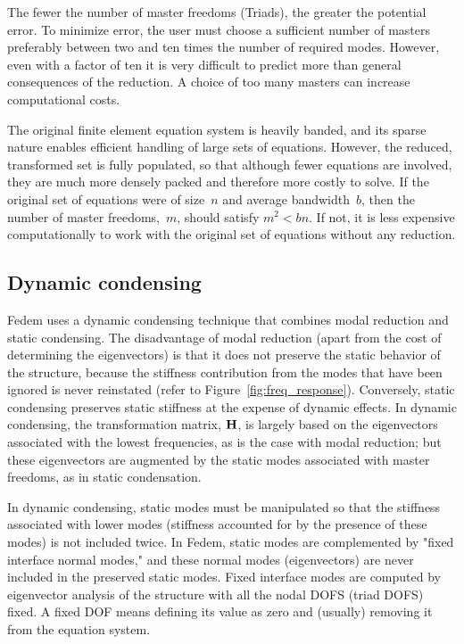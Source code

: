 The fewer the number of master freedoms (Triads), the greater the potential error. To minimize
error, the user must choose a sufficient number of masters \mdash{}preferably between two and
ten times the number of required modes. However, even with a factor of ten it is very difficult
to predict more than general consequences of the reduction. A choice of too many masters can
increase computational costs.

The original finite element equation system is heavily banded, and its sparse nature enables
efficient handling of large sets of equations. However, the reduced, transformed set is fully
populated, so that although fewer equations are involved, they are much more densely packed
and therefore more costly to solve. If the original set of equations were of size~$n$ and average
bandwidth~$b$, then the number of master freedoms,~$m$, should satisfy $m^{2} < bn$. If not,
it is less expensive computationally to work with the original set of equations without any
reduction.

\subsection{Dynamic condensing}

Fedem uses a dynamic condensing technique that combines modal reduction and static condensing.
The disadvantage of modal reduction (apart from the cost of determining the eigenvectors) is
that it does not preserve the static behavior of the structure, because the stiffness contribution
from the modes that have been ignored is never reinstated
(refer to Figure~\ref{fig:freq_response}).
Conversely, static condensing preserves static stiffness at the expense of dynamic effects.
In dynamic condensing, the transformation matrix, $\bf H$, is largely based on the eigenvectors
associated with the lowest frequencies, as is the case with modal reduction; but these eigenvectors
are augmented by the static modes associated with master freedoms, as in static condensation.

In dynamic condensing, static modes must be manipulated so that the stiffness associated with
lower modes (stiffness accounted for by the presence of these modes) is not included twice.
In Fedem, static modes are complemented by "fixed interface normal modes," and these normal
modes (eigenvectors) are never included in the preserved static modes. Fixed interface modes
are computed by eigenvector analysis of the structure with all the nodal DOFS (triad DOFS)
fixed. A fixed DOF means defining its value as zero and (usually) removing it from the equation
system.

